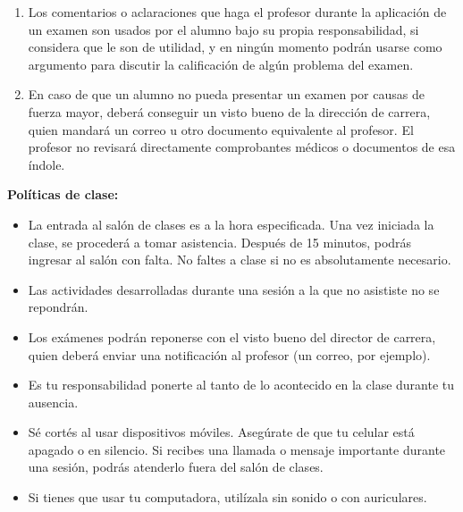 \documentclass[12pt, letterpaper, oneside]{article}
\begin{document}
\begin{enumerate}
  \item Los comentarios o aclaraciones que haga el profesor durante la aplicación de un examen son usados por el alumno bajo su propia responsabilidad, si considera que le son de utilidad, y en ningún momento podrán usarse como argumento para discutir la calificación de algún problema del examen.
  \item En caso de que un alumno no pueda presentar un examen por causas de fuerza mayor, deberá conseguir un visto bueno de la dirección de carrera, quien mandará un correo u otro documento equivalente al profesor. El profesor no revisará directamente comprobantes médicos o documentos de esa índole.
  \end{enumerate}

  \pagebreak
  
  \noindent\textbf{Políticas de clase:}  
  \begin{itemize}
  \item La entrada al salón de clases es a la hora especificada. Una vez iniciada la clase, se procederá a tomar asistencia. Después de 15 minutos, podrás ingresar al salón con falta. No faltes a clase si no es absolutamente necesario.
  \item Las actividades desarrolladas durante una sesión a la que no asististe no se repondrán.
  \item Los exámenes podrán reponerse con el visto bueno del director de carrera, quien deberá enviar una notificación al profesor (un correo, por ejemplo).
  \item Es tu responsabilidad ponerte al tanto de lo acontecido en la clase durante tu ausencia.
  \item Sé cortés al usar dispositivos móviles. Asegúrate de que tu celular está apagado o en silencio. Si recibes una llamada o mensaje importante durante una sesión, podrás atenderlo fuera del salón de clases.\footnotemark
  \item Si tienes que usar tu computadora, utilízala sin sonido o con auriculares.\footnotemark[\value{footnote}]
  \end{itemize}

\end{document}
